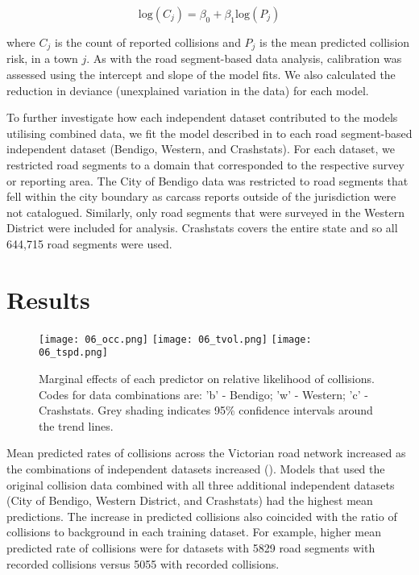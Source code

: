 \begin{equation} \label{eq:62}
\text{log}(C_j) = \beta_0 + \beta_1\text{log}(P_j)
\end{equation}

\noindent where $C_j$ is the count of reported collisions and $P_j$ is the mean predicted collision risk, in a town $j$. As with the road segment-based data analysis, calibration was assessed using the intercept and slope of the model fits. We also calculated the reduction in deviance (unexplained variation in the data) for each model.

To further investigate how each independent dataset contributed to the models utilising combined data, we fit the model described in  to each road segment-based independent dataset (Bendigo, Western, and Crashstats). For each dataset, we restricted road segments to a domain that corresponded to the respective survey or reporting area. The City of Bendigo data was restricted to road segments that fell within the city boundary as carcass reports outside of the jurisdiction were not catalogued. Similarly, only road segments that were surveyed in the Western District were included for analysis. Crashstats covers the entire state and so all 644,715 road segments were used. 

\section{Results}

\begin{figure*}[htp]
  \centering
  \texttt{[image: 06\_occ.png]}
  \texttt{[image: 06\_tvol.png]}
  \texttt{[image: 06\_tspd.png]}
  \caption[Marginal effects of predictor variables on relative likelihood of collision using independent datasets to train models]{Marginal effects of each predictor on relative likelihood of collisions. Codes for data combinations are: 'b' - Bendigo; 'w' - Western; 'c' - Crashstats. Grey shading indicates 95\% confidence intervals around the trend lines.}
  \label{val_effects}
\end{figure*}

Mean predicted rates of collisions across the Victorian road network increased as the combinations of independent datasets increased (). Models that used the original collision data combined with all three additional independent datasets (City of Bendigo, Western District, and Crashstats) had the highest mean predictions. The increase in predicted collisions also coincided with the ratio of collisions to background in each training dataset. For example, higher mean predicted rate of collisions were for datasets with 5829 road segments with recorded collisions versus 5055 with recorded collisions.

